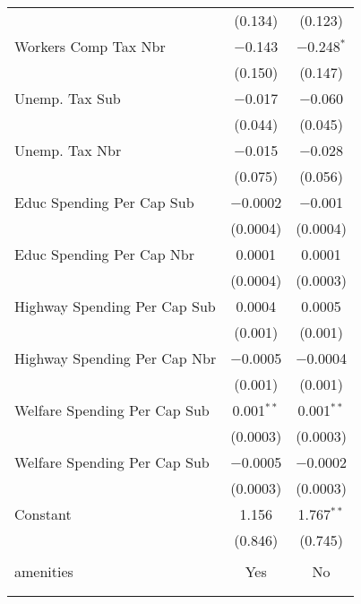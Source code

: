 \begin{table}[!htbp]
\begin{tabular}{@{\extracolsep{5pt}}lcc}
  & (0.134) & (0.123) \\ 
  Workers Comp Tax Nbr & $-$0.143 & $-$0.248$^{*}$ \\ 
  & (0.150) & (0.147) \\ 
  Unemp. Tax Sub & $-$0.017 & $-$0.060 \\ 
  & (0.044) & (0.045) \\ 
  Unemp. Tax Nbr & $-$0.015 & $-$0.028 \\ 
  & (0.075) & (0.056) \\ 
  Educ Spending Per Cap Sub & $-$0.0002 & $-$0.001 \\ 
  & (0.0004) & (0.0004) \\ 
  Educ Spending Per Cap Nbr & 0.0001 & 0.0001 \\ 
  & (0.0004) & (0.0003) \\ 
  Highway Spending Per Cap Sub & 0.0004 & 0.0005 \\ 
  & (0.001) & (0.001) \\ 
  Highway Spending Per Cap Nbr & $-$0.0005 & $-$0.0004 \\ 
  & (0.001) & (0.001) \\ 
  Welfare Spending Per Cap Sub & 0.001$^{**}$ & 0.001$^{**}$ \\ 
  & (0.0003) & (0.0003) \\ 
  Welfare Spending Per Cap Sub & $-$0.0005 & $-$0.0002 \\ 
  & (0.0003) & (0.0003) \\ 
  Constant & 1.156 & 1.767$^{**}$ \\ 
  & (0.846) & (0.745) \\ 
 \hline \\[-1.8ex] 
amenities & Yes & No \\ 
\hline \\[-1.8ex] 
\hline 
\hline \\[-1.8ex] 
\end{tabular} 
\end{table} 
